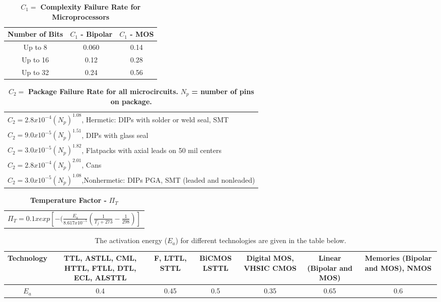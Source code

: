 \begin{table}
\caption{ $C_{1} = $  \textbf{Complexity Failure Rate for Microprocessors}}
\label{table:complexFailureRateMicro}
\begin{tabular}{|c|c|c||} \hline
\textbf{Number of Bits} & $C_{1}$ \textbf{- Bipolar} & $C_{1}$  \textbf{- MOS} \\ \hline
Up to 8 		& 0.060		&	0.14 		\\ \hline
Up to 16		& 0.12		& 	0.28		\\	\hline
Up to 32 		& 0.24		&	0.56		\\ \hline
\end{tabular}
\end{table}

\begin{table}
\caption{ $C_{2} =$ \textbf{Package Failure Rate for all microcircuits.} $N_{p}$ \textbf{= number of pins on package.}}
\label{table:packageFailRateIc}
\begin{tabular}{|l|} \hline
$C_{2} = 2.8 x 10^{-4} (N_{p})^1.08$, Hermetic: DIPs with solder or weld seal, SMT 			\\
$C_{2} = 9.0 x 10^{-5} (N_{p})^1.51$, DIPs with glass seal		\\
$C_{2} = 3.0 x 10^{-5} (N_{p})^1.82$, Flatpacks with axial leads on 50 mil centers		\\
$C_{2} = 2.8 x 10^{-4} (N_{p})^2.01$, Cans			\\
$C_{2} = 3.0 x 10^{-5} (N_{p})^1.08$,Nonhermetic: DIPs PGA, SMT (leaded and nonleaded)			\\ \hline
\end{tabular}
\end{table}

\begin{table}
\caption{\textbf{Temperature Factor -} $\Pi_{T}$}
\label{table:tempFactorIc}
\begin{tabular}{l} \hline
$\Pi_{T} = 0.1xexp[-(\frac{E_{a}}{8.617x10^{-5}} (\frac{1}{T_j + 273} - \frac{1}{298})]$ \\
\end{tabular}
\end{table}

\begin{table}
\caption{ The activation energy ($E_{a}$) for different technologies are given in the table below.}
\label{activationEnergyIc}
\begin{tabular}{|c|c|c|c|c|c|c|} \hline
\textbf{Technology}& 
\textbf{TTL, ASTLL, CML, HTTL, FTLL, DTL, ECL, ALSTTL} &
\textbf{F, LTTL, STTL} &
\textbf{BiCMOS LSTTL} &
\textbf{Digital MOS, VHSIC CMOS} &
\textbf{Linear (Bipolar and MOS)}& 
\textbf{Memories (Bipolar and MOS), NMOS} \\ \hline
$E_{a}$ & 0.4 & 0.45 & 0.5 & 0.35 & 0.65 & 0.6 \\ \hline
\end{tabular}
\end{table}

